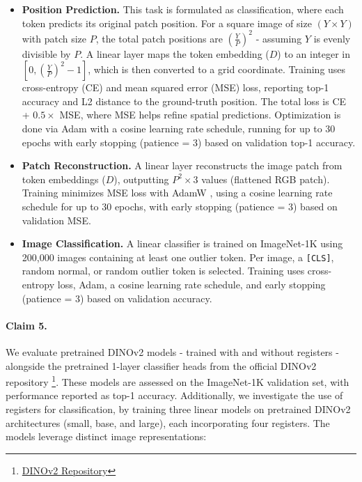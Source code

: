 \documentclass[10pt]{article} \usepackage[preprint]{tmlr}
\begin{document}
\begin{itemize}
    \item \textbf{Position Prediction.} This task is formulated as classification, where each token predicts its original patch position. For a square image of size $(Y \times Y)$ with patch size $P$, the total patch positions are $\left(\frac{Y}{P}\right)^2$ - assuming $Y$ is evenly divisible by $P$. A linear layer maps the token embedding ($D$) to an integer in $[0, \left(\frac{Y}{P}\right)^2 - 1]$, which is then converted to a grid coordinate. Training uses cross-entropy (CE) and mean squared error (MSE) loss, reporting top-1 accuracy and L2 distance to the ground-truth position. The total loss is CE + $0.5 \times$ MSE, where MSE helps refine spatial predictions. Optimization is done via Adam \citep{kingma2017adammethodstochasticoptimization} with a cosine learning rate schedule, running for up to 30 epochs with early stopping (patience = 3) based on validation top-1 accuracy.  

    \item \textbf{Patch Reconstruction.} A linear layer reconstructs the image patch from token embeddings ($D$), outputting $P^2 \times 3$ values (flattened RGB patch). Training minimizes MSE loss with AdamW \citep{loshchilov2019decoupledweightdecayregularization}, using a cosine learning rate schedule for up to 30 epochs, with early stopping (patience = 3) based on validation MSE.

    \item \textbf{Image Classification.} A linear classifier is trained on ImageNet-1K using 200,000 images containing at least one outlier token. Per image, a \texttt{[CLS]}, random normal, or random outlier token is selected. Training uses cross-entropy loss, Adam, a cosine learning rate schedule, and early stopping (patience = 3) based on validation accuracy.
\end{itemize}

\paragraph{Claim 5.}
We evaluate pretrained DINOv2 models - trained with and without registers - alongside the pretrained 1-layer classifier heads from the official DINOv2 repository \footnote{\href{https://github.com/facebookresearch/dinov2}{DINOv2 Repository}}. These models are assessed on the ImageNet-1K validation set, with performance reported as top-1 accuracy. Additionally, we investigate the use of registers for classification, by training three linear models on pretrained DINOv2 architectures (small, base, and large), each incorporating four registers. The models leverage distinct image representations:
\end{document}
